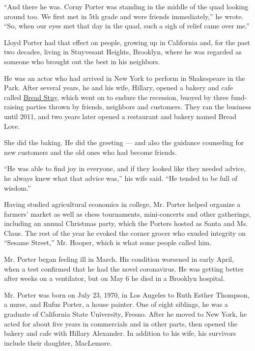 ``And there he was. Corny Porter was standing in the middle of the quad
looking around too. We first met in 5th grade and were friends
immediately,'' he wrote. ``So, when our eyes met that day in the quad,
such a sigh of relief came over me.''

Lloyd Porter had that effect on people, growing up in California and,
for the past two decades, living in Stuyvesant Heights, Brooklyn, where
he was regarded as someone who brought out the best in his neighbors.

He was an actor who had arrived in New York to perform in Shakespeare in
the Park. After several years, he and his wife, Hillary, opened a bakery
and cafe called
\href{https://www.nytimes.com/2010/02/13/nyregion/13metjournal.html}{Bread
Stuy}, which went on to endure the recession, buoyed by three
fund-raising parties thrown by friends, neighbors and customers. They
ran the business until 2011, and two years later opened a restaurant and
bakery named Bread Love.

She did the baking. He did the greeting --- and also the guidance
counseling for new customers and the old ones who had become friends.

``He was able to find joy in everyone, and if they looked like they
needed advice, he always knew what that advice was,'' his wife said.
``He tended to be full of wisdom.''

Having studied agricultural economics in college, Mr. Porter helped
organize a farmers' market as well as chess tournaments, mini-concerts
and other gatherings, including an annual Christmas party, which the
Porters hosted as Santa and Ms. Claus. The rest of the year he evoked
the corner grocer who exuded integrity on ``Sesame Street,'' Mr. Hooper,
which is what some people called him.

Mr. Porter began feeling ill in March. His condition worsened in early
April, when a test confirmed that he had the novel coronavirus. He was
getting better after weeks on a ventilator, but on May 6 he died in a
Brooklyn hospital.

Mr. Porter was born on July 23, 1970, in Los Angeles to Ruth Esther
Thompson, a nurse, and Rufus Porter, a house painter. One of eight
siblings, he was a graduate of California State University, Fresno.
After he moved to New York, he acted for about five years in commercials
and in other parts, then opened the bakery and cafe with Hillary
Alexander. In addition to his wife, his survivors include their
daughter, MacLemore.

